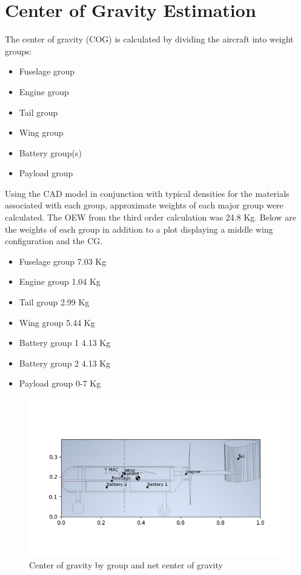 \documentclass[12pt]{report}
\begin{document}
	\chapter{Center of Gravity Estimation}
	
	The center of gravity (COG) is calculated by dividing the aircraft into weight groups:
	\begin{itemize}
		\item Fuselage group
		\item Engine group
		\item Tail group
		\item Wing group
		\item Battery group(s)
		\item Payload group
	\end{itemize}
	
	Using the CAD model in conjunction with typical densities for the materials associated with each group, approximate weights of each major group were calculated. The OEW from the third order calculation was 24.8 Kg. Below are the weights of each group in addition to a plot displaying a middle wing configuration and the CG. 
	
	\begin{itemize}
		\item Fuselage group	7.03 Kg
		\item Engine group		1.04 Kg
		\item Tail group		2.99 Kg
		\item Wing group		5.44 Kg
		\item Battery group 1	4.13 Kg
		\item Battery group 2	4.13 Kg
		\item Payload group		0-7  Kg
	\end{itemize}
	
	\begin{figure}[h!]
		\centering
		\includegraphics[width=6.5in]{Figures/CG_Calculation.png} %
		\caption{Center of gravity by group and net center of gravity}
		\label{fig:CGPlot}
	\end{figure}
\end{document}
